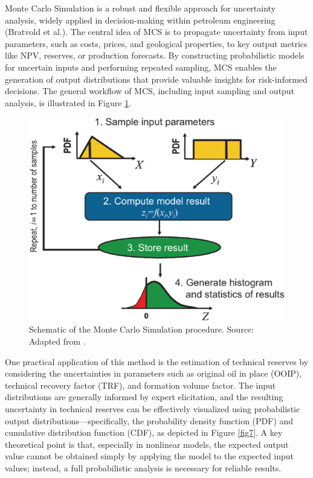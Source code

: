 \documentclass[pdflatex,sn-basic]{sn-jnl}%
\theoremstyle{thmstyleone}%
\theoremstyle{thmstyletwo}%
\theoremstyle{thmstylethree}%
\begin{document}
Monte Carlo Simulation is a robust and flexible approach for uncertainty analysis, widely applied in decision-making within petroleum engineering (Bratvold et al.). The central idea of MCS is to propagate uncertainty from input parameters, such as costs, prices, and geological properties, to key output metrics like NPV, reserves, or production forecasts. By constructing probabilistic models for uncertain inputs and performing repeated sampling, MCS enables the generation of output distributions that provide valuable insights for risk-informed decisions. The general workflow of MCS, including input sampling and output analysis, is illustrated in Figure \ref{fig6}.

\begin{figure}[H]
\centering
\begin{minipage}{0.85\textwidth}
  \includegraphics[width=\textwidth]{schematic_MCS.eps}
  \caption{Schematic of the Monte Carlo Simulation procedure. Source: Adapted from \cite{ref24}.}
  \label{fig6}
\end{minipage}
\end{figure}

One practical application of this method is the estimation of technical reserves by considering the uncertainties in parameters such as original oil in place (OOIP), technical recovery factor (TRF), and formation volume factor. The input distributions are generally informed by expert elicitation, and the resulting uncertainty in technical reserves can be effectively visualized using probabilistic output distributions—specifically, the probability density function (PDF) and cumulative distribution function (CDF), as depicted in Figure \ref{fig7}. A key theoretical point is that, especially in nonlinear models, the expected output value cannot be obtained simply by applying the model to the expected input values; instead, a full probabilistic analysis is necessary for reliable results.
\end{document}
